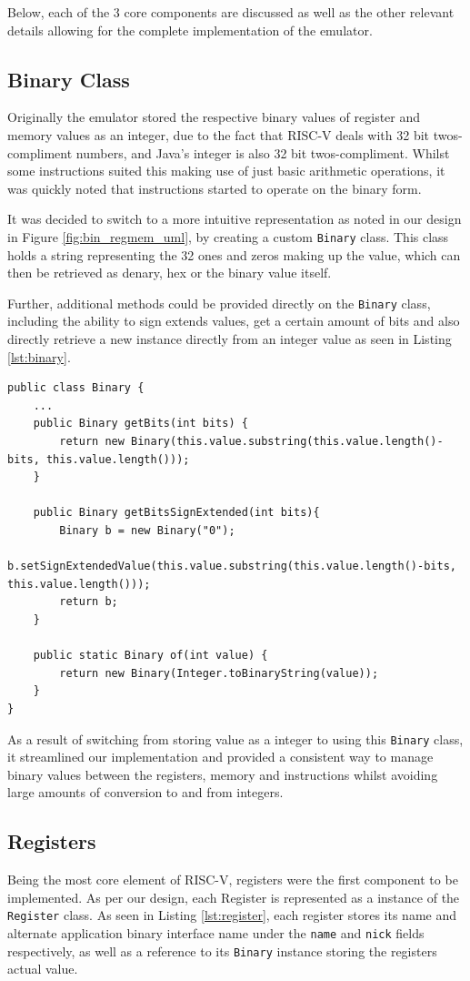 Below, each of the 3 core components are discussed as well as the other relevant details allowing for the complete implementation of the emulator.

\subsection{Binary Class}
Originally the emulator stored the respective binary values of register and memory values as an integer, due to the fact that RISC-V deals with 32 bit twos-compliment numbers, and Java's integer is also 32 bit twos-compliment. Whilst some instructions suited this making use of just basic arithmetic operations, it was quickly noted that instructions started to operate on the binary form.

It was decided to switch to a more intuitive representation as noted in our design in Figure \ref{fig:bin_regmem_uml}, by creating a custom \texttt{Binary} class. This class holds a string representing the 32 ones and zeros making up the value, which can then be retrieved as denary, hex or the binary value itself.

Further, additional methods could be provided directly on the \texttt{Binary} class, including the ability to sign extends values, get a certain amount of bits and also directly retrieve a new instance directly from an integer value as seen in Listing \ref{lst:binary}.

\begin{lstlisting}[caption=Additional Binary Methods, label=lst:binary]
public class Binary {
    ...
    public Binary getBits(int bits) {
        return new Binary(this.value.substring(this.value.length()-bits, this.value.length()));
    }

    public Binary getBitsSignExtended(int bits){
        Binary b = new Binary("0");
        b.setSignExtendedValue(this.value.substring(this.value.length()-bits, this.value.length()));
        return b;
    }

    public static Binary of(int value) {
        return new Binary(Integer.toBinaryString(value));
    }
}
\end{lstlisting}

As a result of switching from storing value as a integer to using this \texttt{Binary} class, it streamlined our implementation and provided a consistent way to manage binary values between the registers, memory and instructions whilst avoiding large amounts of conversion to and from integers.

\subsection{Registers}
Being the most core element of RISC-V, registers were the first component to be implemented. As per our design, each Register is represented as a instance of the \texttt{Register} class. As seen in Listing \ref{lst:register}, each register stores its name and alternate application binary interface name under the \texttt{name} and \texttt{nick} fields respectively, as well as a reference to its \texttt{Binary} instance storing the registers actual value.

